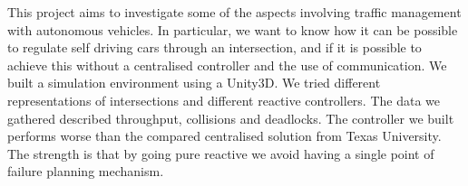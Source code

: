 \begin{em}
This project aims to investigate some of the aspects involving traffic management with autonomous vehicles.
In particular, we want to know how it can be possible to regulate self driving cars through an intersection, and if it is possible to achieve this without a centralised controller and the use of communication.
We built a simulation environment using a Unity3D. We tried different representations of intersections and different reactive controllers.
The data we gathered described throughput, collisions and deadlocks.
The controller we built performs worse than the compared centralised solution from Texas University.
The strength is that by going pure reactive we avoid having a single point of failure planning mechanism.
\end{em}